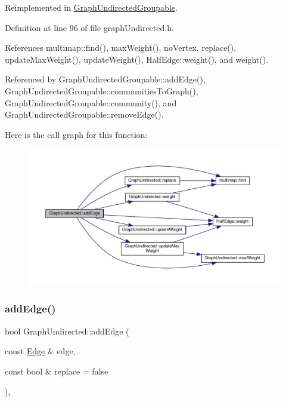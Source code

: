 Reimplemented in \hyperlink{classGraphUndirectedGroupable_a8c010517bff903a50807e6e8ad8cc6db}{Graph\+Undirected\+Groupable}.



Definition at line 96 of file graph\+Undirected.\+h.



References multimap\+::find(), max\+Weight(), no\+Vertex, replace(), update\+Max\+Weight(), update\+Weight(), Half\+Edge\+::weight(), and weight().



Referenced by Graph\+Undirected\+Groupable\+::add\+Edge(), Graph\+Undirected\+Groupable\+::communities\+To\+Graph(), Graph\+Undirected\+Groupable\+::community(), and Graph\+Undirected\+Groupable\+::remove\+Edge().

Here is the call graph for this function\+:\nopagebreak
\begin{figure}[H]
\begin{center}
\leavevmode
\includegraphics[width=350pt]{classGraphUndirected_a2be69d987f3b4fa1cf547898d30b47d2_cgraph}
\end{center}
\end{figure}
\mbox{\label{classGraphUndirected_a366c8b7dbf1cbfe408d5399ad64494dc}} 
\subsubsection{\texorpdfstring{add\+Edge()}{addEdge()}\hspace{0.1cm}{\footnotesize\ttfamily [2/2]}}
{\footnotesize\ttfamily bool Graph\+Undirected\+::add\+Edge (\begin{DoxyParamCaption}\item[{const \hyperlink{classEdge}{Edge} \&}]{edge,  }\item[{const bool \&}]{replace = {\ttfamily false} }\end{DoxyParamCaption})\hspace{0.3cm}{\ttfamily [inline]}, {\ttfamily [virtual]}}

